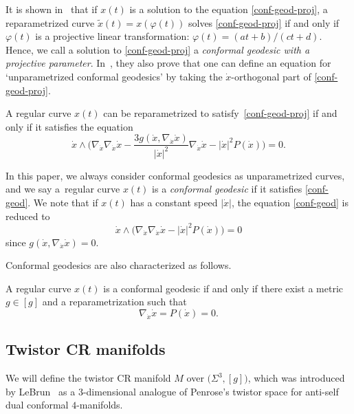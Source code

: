 It is shown in~\cite{BE} that if $x(t)$ is a solution to the equation \eqref{conf-geod-proj}, a reparametrized curve $\tilde x(t)=x(\varphi(t))$ solves \eqref{conf-geod-proj} if and only if $\varphi(t)$ is a projective linear transformation: $\varphi(t)=(at+b)/(ct+d)$. Hence, we call a solution to \eqref{conf-geod-proj}
a {\it conformal geodesic with a projective parameter}. In~\cite{BE}, they also prove that one can define an equation for `unparametrized conformal geodesics' by taking the $\dot x$-orthogonal part of \eqref{conf-geod-proj}.
\begin{Proposition}[{\cite[Proposition 4.2]{BE}}]
A regular curve $x(t)$ can be reparametrized to satisfy~\eqref{conf-geod-proj} if and only if it satisfies the equation
\begin{equation}\label{conf-geod}
\dot x\wedge\biggl(\nabla_{\dot x}\nabla_{\dot x}\dot x-\frac{3g(\dot x, \nabla_{\dot x}\dot x)}{|\dot x|^2}\nabla_{\dot x}\dot x-|\dot x|^2P(\dot x)\biggr)=0.
\end{equation}
\end{Proposition}
In this paper, we always consider conformal geodesics as unparametrized curves, and we say a~regular curve $x(t)$ is a {\it conformal geodesic} if it satisfies \eqref{conf-geod}.
We note that if $x(t)$ has a constant speed $|\dot x|$, the equation \eqref{conf-geod} is reduced to
\begin{equation}\label{conf-geod-const-speed}
\dot x\wedge\bigl(\nabla_{\dot x}\nabla_{\dot x}\dot x-|\dot x|^2P(\dot x)\bigr)=0
\end{equation}
since $g(\dot x, \nabla_{\dot x}\dot x)=0$.

Conformal geodesics are also characterized as follows.

\begin{Proposition}[{\cite[Proposition 3.3]{BE}}]\label{conf-geod-characterization}
A regular curve $x(t)$ is a conformal geodesic if and only if there exist a metric $g\in[g]$ and a reparametrization such that
\[
\nabla_{\dot x}\dot x=P(\dot x)=0.
\]
\end{Proposition}

\subsection{Twistor CR manifolds}
We will define the twistor CR manifold $M$ over $\bigl(\Sigma^3, [g]\bigr)$, which was introduced by LeBrun~\cite{LeB} as a $3$-dimensional analogue of Penrose's twistor space for anti-self dual conformal $4$-manifolds.

